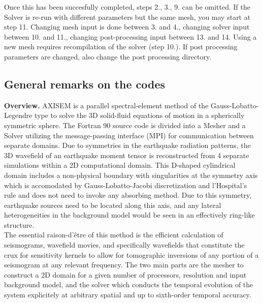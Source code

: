 \documentclass[11pt,letter,fleqn,english,notitlepage]{article}
\begin{document}
Once this has been succesfully completed, steps 2., 3., 9. can be omitted. If the Solver is re-run with different parameters but the
same mesh, you may start at step 11. Changing mesh input is done between 3. and 4., changing solver input between 10. and 11.,
changing post-processing input between 13. and 14. Using a new mesh requires recompilation of the solver (step 10.). If post
processing parameters are changed, also change the post processing directory.

\subsection{General remarks on the codes}
\textbf{Overview.} 
AXISEM is a parallel spectral-element method of the Gauss-Lobatto-Legendre type to 
solve the 3D solid-fluid equations of motion in a spherically symmetric sphere. The Fortran 90 source 
code is divided into a Mesher and a Solver utilizing the message-passing interface (MPI) for communication
between separate domains. Due to symmetries in the earthquake radiation patterns, 
the 3D wavefield of an earthquake moment tensor is reconstructed from 4 separate simulations
within a 2D computational domain. This D-shaped cylindrical domain includes a non-physical boundary with
singularities at the symmetry axis which is accomodated by Gauss-Lobatto-Jacobi discretization and 
l'Hospital's rule and does not need to invoke any absorbing method. Due to this symmetry, earthquake 
sources need to be located along this axis, and any lateral heterogeneities in the background model 
would be seen in an effectively ring-like structure.\\
The essential raison-d'\^{e}tre of this method is the efficient calculation 
of seismograms, wavefield movies, and specifically wavefields that constitute the crux for 
sensitivity kernels to allow for tomographic inversions of any portion of a seismogram at any relevant 
frequency. The two main parts are the mesher to construct a 2D domain for a given number of processors, 
resolution and input background model, and the solver which conducts the temporal evolution of the system 
explicitely at arbitrary spatial and up to sixth-order temporal accuracy.\\
\end{document}
